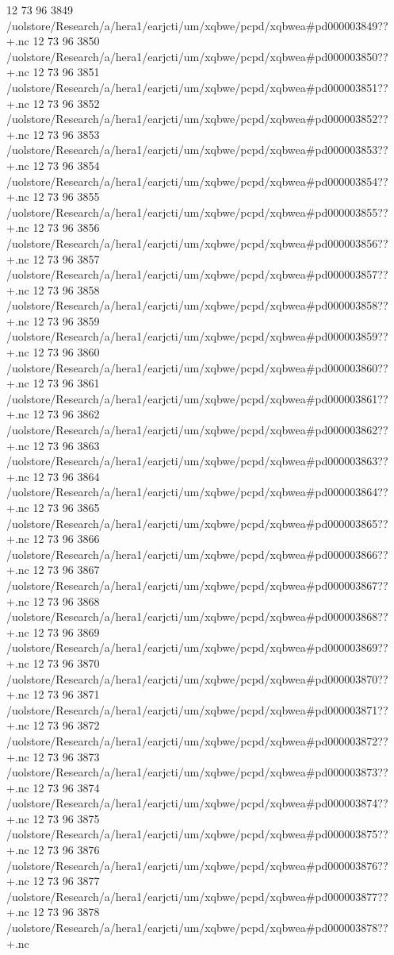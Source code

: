 12 73 96
3849
/uolstore/Research/a/hera1/earjcti/um/xqbwe/pcpd/xqbwea#pd000003849??+.nc
12 73 96
3850
/uolstore/Research/a/hera1/earjcti/um/xqbwe/pcpd/xqbwea#pd000003850??+.nc
12 73 96
3851
/uolstore/Research/a/hera1/earjcti/um/xqbwe/pcpd/xqbwea#pd000003851??+.nc
12 73 96
3852
/uolstore/Research/a/hera1/earjcti/um/xqbwe/pcpd/xqbwea#pd000003852??+.nc
12 73 96
3853
/uolstore/Research/a/hera1/earjcti/um/xqbwe/pcpd/xqbwea#pd000003853??+.nc
12 73 96
3854
/uolstore/Research/a/hera1/earjcti/um/xqbwe/pcpd/xqbwea#pd000003854??+.nc
12 73 96
3855
/uolstore/Research/a/hera1/earjcti/um/xqbwe/pcpd/xqbwea#pd000003855??+.nc
12 73 96
3856
/uolstore/Research/a/hera1/earjcti/um/xqbwe/pcpd/xqbwea#pd000003856??+.nc
12 73 96
3857
/uolstore/Research/a/hera1/earjcti/um/xqbwe/pcpd/xqbwea#pd000003857??+.nc
12 73 96
3858
/uolstore/Research/a/hera1/earjcti/um/xqbwe/pcpd/xqbwea#pd000003858??+.nc
12 73 96
3859
/uolstore/Research/a/hera1/earjcti/um/xqbwe/pcpd/xqbwea#pd000003859??+.nc
12 73 96
3860
/uolstore/Research/a/hera1/earjcti/um/xqbwe/pcpd/xqbwea#pd000003860??+.nc
12 73 96
3861
/uolstore/Research/a/hera1/earjcti/um/xqbwe/pcpd/xqbwea#pd000003861??+.nc
12 73 96
3862
/uolstore/Research/a/hera1/earjcti/um/xqbwe/pcpd/xqbwea#pd000003862??+.nc
12 73 96
3863
/uolstore/Research/a/hera1/earjcti/um/xqbwe/pcpd/xqbwea#pd000003863??+.nc
12 73 96
3864
/uolstore/Research/a/hera1/earjcti/um/xqbwe/pcpd/xqbwea#pd000003864??+.nc
12 73 96
3865
/uolstore/Research/a/hera1/earjcti/um/xqbwe/pcpd/xqbwea#pd000003865??+.nc
12 73 96
3866
/uolstore/Research/a/hera1/earjcti/um/xqbwe/pcpd/xqbwea#pd000003866??+.nc
12 73 96
3867
/uolstore/Research/a/hera1/earjcti/um/xqbwe/pcpd/xqbwea#pd000003867??+.nc
12 73 96
3868
/uolstore/Research/a/hera1/earjcti/um/xqbwe/pcpd/xqbwea#pd000003868??+.nc
12 73 96
3869
/uolstore/Research/a/hera1/earjcti/um/xqbwe/pcpd/xqbwea#pd000003869??+.nc
12 73 96
3870
/uolstore/Research/a/hera1/earjcti/um/xqbwe/pcpd/xqbwea#pd000003870??+.nc
12 73 96
3871
/uolstore/Research/a/hera1/earjcti/um/xqbwe/pcpd/xqbwea#pd000003871??+.nc
12 73 96
3872
/uolstore/Research/a/hera1/earjcti/um/xqbwe/pcpd/xqbwea#pd000003872??+.nc
12 73 96
3873
/uolstore/Research/a/hera1/earjcti/um/xqbwe/pcpd/xqbwea#pd000003873??+.nc
12 73 96
3874
/uolstore/Research/a/hera1/earjcti/um/xqbwe/pcpd/xqbwea#pd000003874??+.nc
12 73 96
3875
/uolstore/Research/a/hera1/earjcti/um/xqbwe/pcpd/xqbwea#pd000003875??+.nc
12 73 96
3876
/uolstore/Research/a/hera1/earjcti/um/xqbwe/pcpd/xqbwea#pd000003876??+.nc
12 73 96
3877
/uolstore/Research/a/hera1/earjcti/um/xqbwe/pcpd/xqbwea#pd000003877??+.nc
12 73 96
3878
/uolstore/Research/a/hera1/earjcti/um/xqbwe/pcpd/xqbwea#pd000003878??+.nc
